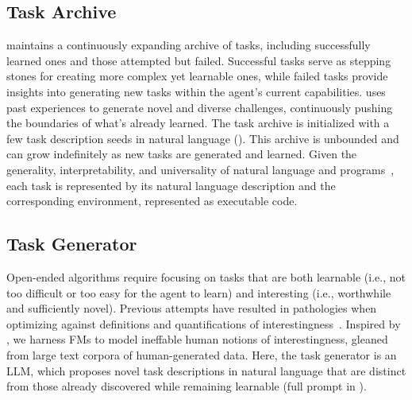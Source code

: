 \documentclass{article} %
\begin{document}
\vspace{-5pt}
\subsection{Task Archive}
\label{subsec:task-archive}
\vspace{-4pt}

\ours{} maintains a continuously expanding archive of tasks, including successfully learned ones and those attempted but failed. Successful tasks serve as stepping stones for creating more complex yet learnable ones, while failed tasks provide insights into generating new tasks within the agent's current capabilities. \ours{} uses past experiences to generate novel and diverse challenges, continuously pushing the boundaries of what's already learned. The task archive is initialized with a few task description seeds in natural language (). This archive is unbounded and can grow indefinitely as new tasks are generated and learned. Given the generality, interpretability, and universality of natural language and programs~\citep{hopcroft2001introduction}, each task is represented by its natural language description and the corresponding environment, represented as executable code.

\vspace{-5pt}
\subsection{Task Generator}
\label{subsec:task generator}
\vspace{-4pt}

Open-ended algorithms require focusing on tasks that are both learnable (i.e., not too difficult or too easy for the agent to learn) and interesting (i.e., worthwhile and sufficiently novel). Previous attempts have resulted in pathologies when optimizing against definitions and quantifications of interestingness~\citep{zhang_OMNIOpenendednessModels_2023}. Inspired by \citet{zhang_OMNIOpenendednessModels_2023}, we harness FMs to model ineffable human notions of interestingness, gleaned from large text corpora of human-generated data. Here, the task generator is an LLM, which proposes novel task descriptions in natural language that are distinct from those already discovered while remaining learnable (full prompt in ).
\end{document}
